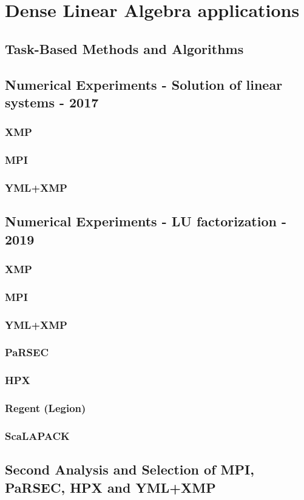 \chapter{Dense Linear Algebra applications}

\section{Task-Based Methods and Algorithms}

\section{Numerical Experiments - Solution of linear systems - 2017}
\subsection{XMP}
\subsection{MPI}
\subsection{YML+XMP}

\section{Numerical Experiments - LU factorization - 2019}
\subsection{XMP}
\subsection{MPI}
\subsection{YML+XMP}
\subsection{PaRSEC}
\subsection{HPX}
\subsection{Regent (Legion)}
\subsection{ScaLAPACK}

\section{Second Analysis and Selection of MPI, PaRSEC, HPX and YML+XMP}